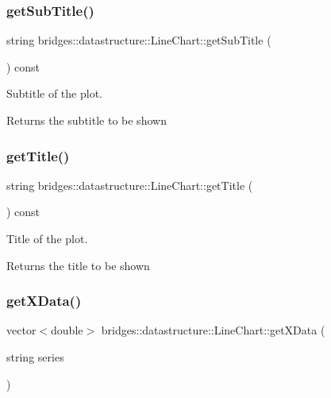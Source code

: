 \subsubsection{\texorpdfstring{getSubTitle()}{getSubTitle()}}
{\footnotesize\ttfamily string bridges\+::datastructure\+::\+Line\+Chart\+::get\+Sub\+Title (\begin{DoxyParamCaption}{ }\end{DoxyParamCaption}) const\hspace{0.3cm}{\ttfamily [inline]}}



Subtitle of the plot. 

\begin{DoxyReturn}{Returns}
the subtitle to be shown 
\end{DoxyReturn}
\mbox{\label{classbridges_1_1datastructure_1_1_line_chart_aa38d6cf9657d2757a98b657f079ae2bc}} 
\subsubsection{\texorpdfstring{getTitle()}{getTitle()}}
{\footnotesize\ttfamily string bridges\+::datastructure\+::\+Line\+Chart\+::get\+Title (\begin{DoxyParamCaption}{ }\end{DoxyParamCaption}) const\hspace{0.3cm}{\ttfamily [inline]}}



Title of the plot. 

\begin{DoxyReturn}{Returns}
the title to be shown 
\end{DoxyReturn}
\mbox{\label{classbridges_1_1datastructure_1_1_line_chart_af624657af0ddd7d58c1d9290b4874280}} 
\subsubsection{\texorpdfstring{getXData()}{getXData()}}
{\footnotesize\ttfamily vector$<$double$>$ bridges\+::datastructure\+::\+Line\+Chart\+::get\+X\+Data (\begin{DoxyParamCaption}\item[{string}]{series }\end{DoxyParamCaption})\hspace{0.3cm}{\ttfamily [inline]}}



